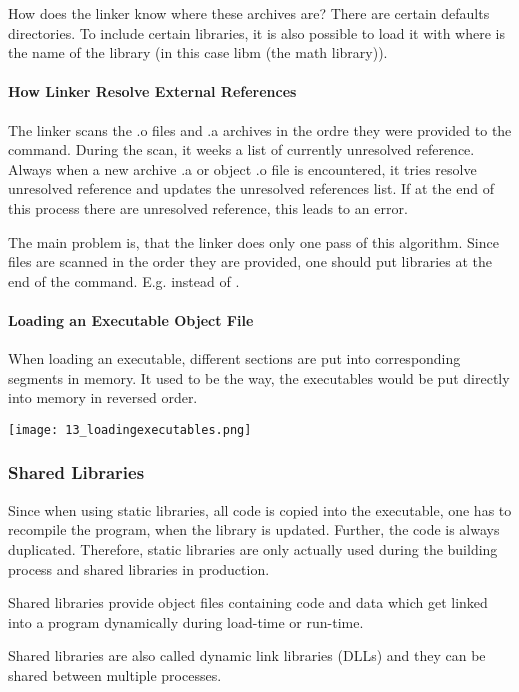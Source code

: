 How does the linker know where these archives are? There are certain defaults directories. To include certain libraries, it is also possible to load it with  where  is the name of the library (in this case libm (the math library)).

\paragraph{How Linker Resolve External References}
The linker scans the .o files and .a archives in the ordre they were provided to the command. During the scan, it weeks a list of currently unresolved reference. Always when a new archive .a or object .o file is encountered, it tries resolve unresolved reference and updates the unresolved references list. If at the end of this process there are unresolved reference, this leads to an error.

The main problem is, that the linker does only one pass of this algorithm. Since files are scanned in the order they are provided, one should put libraries at the end of the command. E.g.  instead of .

\paragraph{Loading an Executable Object File}
When loading an executable, different sections are put into corresponding segments in memory. It used to be the way, the executables would be put directly into memory in reversed order.

\texttt{[image: 13\_loadingexecutables.png]}

\subsubsection{Shared Libraries}
Since when using static libraries, all code is copied into the executable, one has to recompile the program, when the library is updated. Further, the code is always duplicated. Therefore, static libraries are only actually used during the building process and shared libraries in production.

Shared libraries provide object files containing code and data which get linked into a program dynamically during load-time or run-time.

Shared libraries are also called dynamic link libraries (DLLs) and they can be shared between multiple processes.

